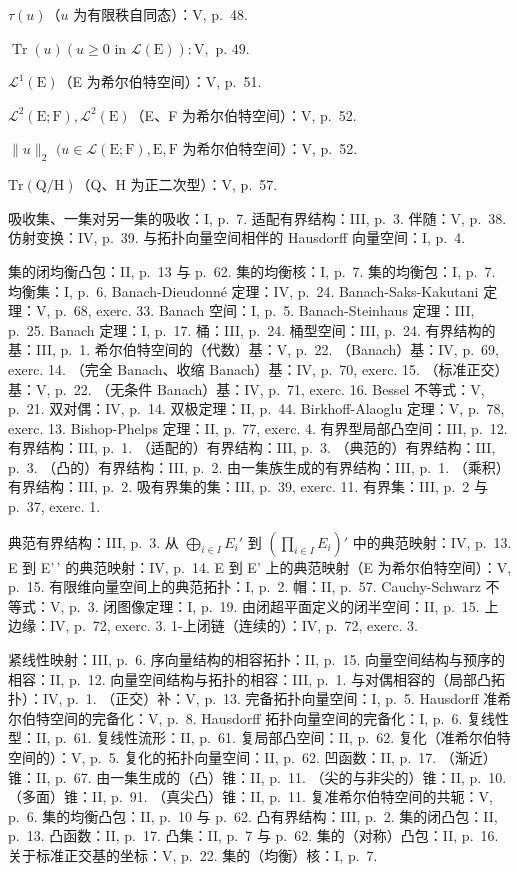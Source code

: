 \(\tau (u)\)（\(u\) 为有限秩自同态）：V, p.~48.

\(\operatorname{Tr}(u) (u \geqslant 0 \text{ in } \mathcal{L}(\mathrm{E})): \mathrm{V}, \text{ p. } 49.\)

\(\mathcal{L}^1 (\mathrm{E})\)（E 为希尔伯特空间）：V, p.~51.

\(\mathcal{L}^2 (\mathrm{E};\mathrm{F}),\mathcal{L}^2 (\mathrm{E})\)（E、F 为希尔伯特空间）：V, p.~52.

\(\| u\| _2\) \((u\in \mathcal{L}(\mathrm{E};\mathrm{F}),\mathrm{E},\mathrm{F}\) 为希尔伯特空间）：V, p.~52.

\(\mathrm{Tr}(\mathrm{Q} / \mathrm{H})\)（Q、H 为正二次型）：V, p.~57.


吸收集、一集对另一集的吸收：I, p.~7. 适配有界结构：III, p.~3. 伴随：V, p.~38. 仿射变换：IV, p.~39. 与拓扑向量空间相伴的 Hausdorff 向量空间：I, p.~4.

集的闭均衡凸包：II, p.~13 与 p.~62. 集的均衡核：I, p.~7. 集的均衡包：I, p.~7. 均衡集：I, p.~6. Banach-Dieudonné 定理：IV, p.~24. Banach-Saks-Kakutani 定理：V, p.~68, exerc. 33. Banach 空间：I, p.~5. Banach-Steinhaus 定理：III, p.~25. Banach 定理：I, p.~17. 桶：III, p.~24. 桶型空间：III, p.~24. 有界结构的基：III, p.~1. 希尔伯特空间的（代数）基：V, p.~22. （Banach）基：IV, p.~69, exerc. 14. （完全 Banach、收缩 Banach）基：IV, p.~70, exerc. 15. （标准正交）基：V, p.~22. （无条件 Banach）基：IV, p.~71, exerc. 16. Bessel 不等式：V, p.~21. 双对偶：IV, p.~14. 双极定理：II, p.~44. Birkhoff-Alaoglu 定理：V, p.~78, exerc. 13. Bishop-Phelps 定理：II, p.~77, exerc. 4. 有界型局部凸空间：III, p.~12. 有界结构：III, p.~1. （适配的）有界结构：III, p.~3. （典范的）有界结构：III, p.~3. （凸的）有界结构：III, p.~2. 由一集族生成的有界结构：III, p.~1. （乘积）有界结构：III, p.~2. 吸有界集的集：III, p.~39, exerc. 11. 有界集：III, p.~2 与 p.~37, exerc. 1.

典范有界结构：III, p.~3. 从 \(\bigoplus_{i\in I}E_i'\) 到 \(\left(\prod_{i\in I}E_i\right)'\) 中的典范映射：IV, p.~13. E 到 E'\,' 的典范映射：IV, p.~14. E 到 E' 上的典范映射（E 为希尔伯特空间）：V, p.~15. 有限维向量空间上的典范拓扑：I, p.~2. 帽：II, p.~57. Cauchy-Schwarz 不等式：V, p.~3. 闭图像定理：I, p.~19. 由闭超平面定义的闭半空间：II, p.~15. 上边缘：IV, p.~72, exerc. 3. 1-上闭链（连续的）：IV, p.~72, exerc. 3.

紧线性映射：III, p.~6. 序向量结构的相容拓扑：II, p.~15. 向量空间结构与预序的相容：II, p.~12. 向量空间结构与拓扑的相容：III, p.~1. 与对偶相容的（局部凸拓扑）：IV, p.~1. （正交）补：V, p.~13. 完备拓扑向量空间：I, p.~5. Hausdorff 准希尔伯特空间的完备化：V, p.~8. Hausdorff 拓扑向量空间的完备化：I, p.~6. 复线性型：II, p.~61. 复线性流形：II, p.~61. 复局部凸空间：II, p.~62. 复化（准希尔伯特空间的）：V, p.~5. 复化的拓扑向量空间：II, p.~62. 凹函数：II, p.~17. （渐近）锥：II, p.~67. 由一集生成的（凸）锥：II, p.~11. （尖的与非尖的）锥：II, p.~10. （多面）锥：II, p.~91. （真尖凸）锥：II, p.~11. 复准希尔伯特空间的共轭：V, p.~6. 集的均衡凸包：II, p.~10 与 p.~62. 凸有界结构：III, p.~2. 集的闭凸包：II, p.~13. 凸函数：II, p.~17. 凸集：II, p.~7 与 p.~62. 集的（对称）凸包：II, p.~16. 关于标准正交基的坐标：V, p.~22. 集的（均衡）核：I, p.~7.

